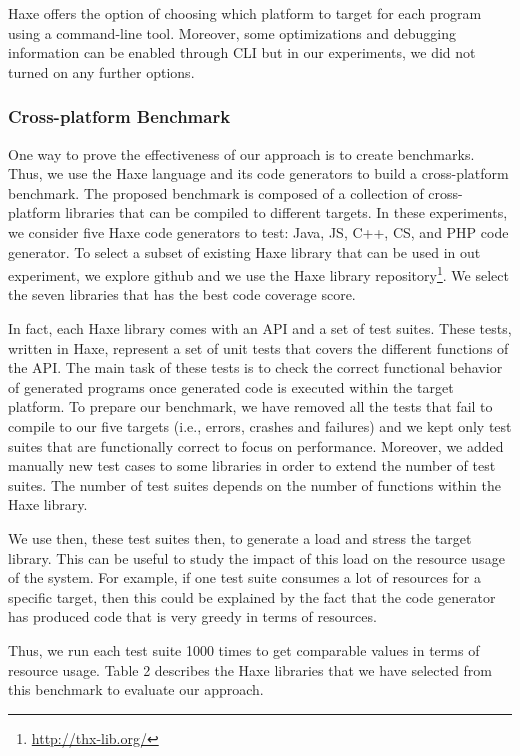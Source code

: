 Haxe offers the option of choosing which platform to target for each program using a command-line tool. Moreover, some optimizations and debugging information can be enabled through CLI but in our experiments, we did not turned on any further options. 

\subsubsection{Cross-platform Benchmark}
One way to prove the effectiveness of our approach is to create benchmarks. Thus, we use the Haxe language and its code generators to build a cross-platform benchmark. The proposed benchmark is composed of a collection of cross-platform libraries that can be compiled to different targets. In these experiments, we consider five Haxe code generators to test: Java, JS, C++, CS, and PHP code generator. To select a subset of existing Haxe library that can be used in out experiment, we explore github and we use the Haxe library repository\footnote{\url{http://thx-lib.org/}}. We select the seven libraries that has the best code coverage score. 

In fact, each Haxe library comes with an API and a set of test suites. These tests, written in Haxe, represent a set of unit tests that covers the different functions of the API. The main task of these tests is to check the correct functional behavior of generated programs once generated code is executed within the target platform. To prepare our benchmark, we have removed all the tests that fail to compile to our five targets (i.e., errors, crashes and failures) and we kept only test suites that are functionally correct to focus on performance.  
Moreover, we added manually new test cases to some libraries in order to extend the number of test suites. The number of test suites depends on the number of functions within the Haxe library.



We use then, these test suites then, to generate a load and stress the target library. This can be useful to study the impact of this load on the resource usage of the system. For example, if one test suite consumes a lot of resources for a specific target, then this could be explained by the fact that the code generator has produced code that is very greedy in terms of resources.

Thus, we run each test suite 1000 times to get comparable values in terms of resource usage.
Table 2 describes the Haxe libraries that we have selected from this benchmark to evaluate our
approach.

